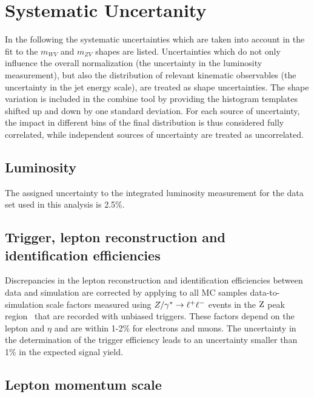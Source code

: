 \section{Systematic Uncertanity} %
\label{sec:systematic_uncertanity}
In the following the systematic uncertainties which are taken into account in the fit to the $m_{WV}$ and $m_{ZV}$ shapes are listed.  
Uncertainties which do not only influence the overall normalization (\eg the uncertainty in the luminosity measurement), but also the distribution of relevant kinematic observables (\eg the uncertainty in the jet energy scale), are treated as shape uncertainties.
The shape variation is included in the combine tool by providing the histogram templates shifted up and down by one standard deviation.
For each source of uncertainty, the impact in different bins of the final distribution is thus considered fully correlated, while independent sources of uncertainty are treated as uncorrelated. 

\subsection{Luminosity}

The assigned uncertainty to the integrated luminosity measurement for
the data set used in this analysis is 2.5\%.

\subsection{Trigger, lepton reconstruction and identification efficiencies}

Discrepancies in the lepton reconstruction and identification
efficiencies between data and simulation are corrected by applying
to all MC samples 
data-to-simulation scale factors measured using $Z/\gamma^*\to\ell^+\ell^-$ events in the $\mathrm{Z}$
peak region~\cite{Tag_probe} that are recorded with unbiased triggers. These factors
depend on the lepton \pt and $\eta$ and are within 1-2\% for electrons and muons.
The uncertainty in the determination of the trigger efficiency leads to an uncertainty smaller than 1\% in the expected signal yield. 

\subsection{Lepton momentum scale}

